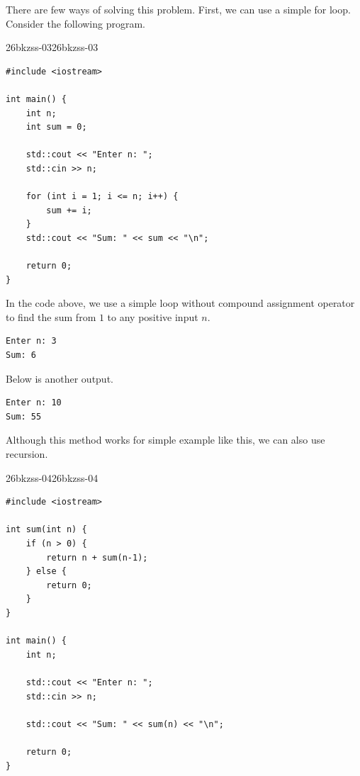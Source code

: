 \documentclass[../../../main.tex]{subfiles}
\begin{document}
\begin{solution}
There are few ways of solving this problem. First, we can use a
simple for loop. Consider the following program.

\begin{cppboxSolution}{26bkzss-03}{26bkzss-03}
\begin{lstlisting}[style=cppstyle]
#include <iostream>

int main() {
    int n;
    int sum = 0;

    std::cout << "Enter n: ";
    std::cin >> n;

    for (int i = 1; i <= n; i++) {
        sum += i;
    }
    std::cout << "Sum: " << sum << "\n";

    return 0;
}
\end{lstlisting}
\end{cppboxSolution}

In the code above, we use a simple loop without compound assignment
operator to find the sum from $1$ to any positive input $n$.

\begin{outputboxSolution}
\begin{lstlisting}[style=basic]
Enter n: 3
Sum: 6
\end{lstlisting}
\end{outputboxSolution}

Below is another output.

\begin{outputboxSolution}
\begin{lstlisting}[style=basic]
Enter n: 10
Sum: 55
\end{lstlisting}
\end{outputboxSolution}

Although this method works for simple example like this, we can also
use recursion.

\begin{cppboxSolution}{26bkzss-04}{26bkzss-04}
\begin{lstlisting}[style=cppstyle]
#include <iostream>

int sum(int n) {
    if (n > 0) {
        return n + sum(n-1);
    } else {
        return 0;
    }
}

int main() {
    int n;

    std::cout << "Enter n: ";
    std::cin >> n;
    
    std::cout << "Sum: " << sum(n) << "\n";

    return 0;
}
\end{lstlisting}
\end{cppboxSolution}


\end{solution}
\end{document}
